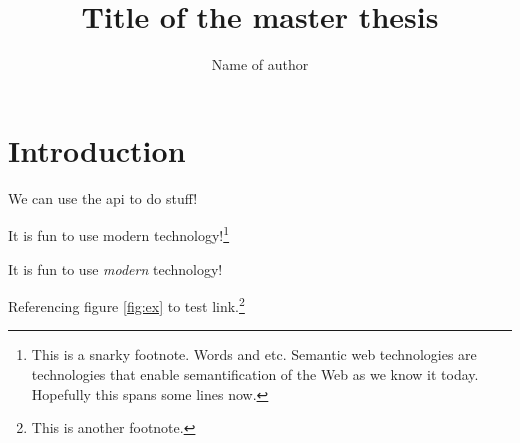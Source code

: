 \documentclass[final,10pt]{../../uit-thesis}
\begin{document}

\title{Title of the master thesis}
\author{Name of author}


\maketitle

\frontmatter

\tableofcontents


\printglossaries
{}

\mainmatter

\chapter{Introduction}
\lipsum[1]
\lipsum[1]
\lipsum[1-7]

We can use the \ac{api} to do stuff!

It is fun to use modern  technology!\footnote{This is a snarky
footnote. Words and etc. Semantic web technologies are technologies that enable
semantification of the Web as we know it today. Hopefully this spans some lines
now.}

It is fun to use \emph{modern } technology!

Referencing figure \ref{fig:ex} to test link.\footnote{This is another
footnote.}
\end{document}
